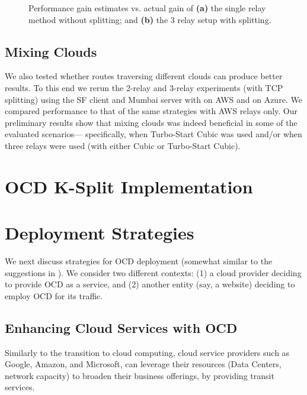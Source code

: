 \documentclass[newfonts=false,format=sigconf,10pt,letterpaper]{acmart}
\providecommand{\vs}{vs. }
\newcommand{\ksplit}{K-Split\xspace}
\begin{document}
\begin{figure}[t]
\begin{subfigure}{0.47\columnwidth}
    \caption{} \label{fig:rtt-estimate-ssh-3hop}
\end{subfigure}
    \caption{Performance gain estimates \vs actual gain of \textbf{(a)} the single relay method without splitting; and \textbf{(b)} the 3 relay setup with splitting.}
\end{figure}

\subsection{Mixing Clouds}\label{subsec:mixing-clouds}

We also tested whether routes traversing different clouds can produce better results. To this end we rerun the 2-relay and 3-relay experiments (with TCP splitting) using the SF client and Mumbai server with \rc on AWS and \rs on Azure. We compared performance to that of the same strategies with AWS relays only. Our preliminary results show that mixing clouds was indeed beneficial in some of the evaluated scenarios--- specifically, when Turbo-Start Cubic was used and/or when three relays were used (with either Cubic or Turbo-Start Cubic). 


\section{OCD \ksplit Implementation}\label{sec:implementation}




\section{Deployment Strategies}\label{sec:deployment}

We next discuss strategies for OCD deployment (somewhat similar to the suggestions in \cite{pucha2005slot}). We consider two different contexts: (1) a cloud provider deciding to provide OCD as a service, and (2) another entity (say, a website) deciding to employ OCD for its traffic. 

\subsection{Enhancing Cloud Services with OCD}\label{subsec:enhancing-w-ocd}

Similarly to the transition to cloud computing, cloud service providers such as Google, Amazon, and Microsoft, can leverage their resources (Data Centers, network capacity) to broaden their business offerings, by providing transit services.
\end{document}
